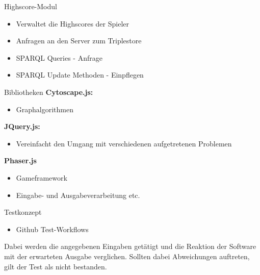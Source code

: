 \documentclass{beamer}
\begin{document}
\begin{frame}{Highscore-Modul}
\begin{itemize}
\item Verwaltet die Highscores der Spieler
\item Anfragen an den Server zum Triplestore
\item SPARQL Queries - Anfrage
\item SPARQL Update Methoden - Einpflegen
\end{itemize}
\end{frame}


\begin{frame}{Bibliotheken}
\textbf{Cytoscape.js:}
\begin{itemize}
\item Graphalgorithmen
\end{itemize} 
\textbf{JQuery.js:} 
\begin{itemize}
\item Vereinfacht den Umgang mit verschiedenen aufgetretenen Problemen 
\end{itemize}
\textbf{Phaser.js}
\begin{itemize}
\item Gameframework
\item Eingabe- und Ausgabeverarbeitung etc.
\end{itemize}
\end{frame}
\begin{frame}{Testkonzept}
\begin{itemize}
\item Github Test-Workflows
\end{itemize}Dabei werden die angegebenen Eingaben getätigt und die Reaktion der Software mit der erwarteten Ausgabe verglichen. Sollten dabei Abweichungen auftreten, gilt der Test als nicht bestanden.
\end{frame}
\end{document}
